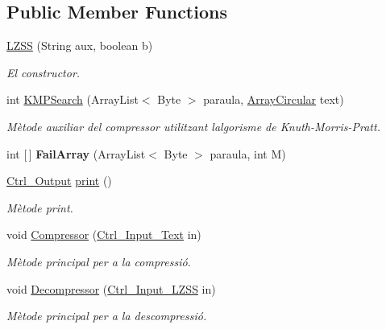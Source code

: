 \subsection*{Public Member Functions}
\begin{DoxyCompactItemize}
\item 
\hyperlink{classdomini_1_1algorithm_1_1LZSS_a991f29ccc89ecbb5645ea8f123205e20}{L\+Z\+SS} (String aux, boolean b)
\begin{DoxyCompactList}\small\item\em El constructor. \end{DoxyCompactList}\item 
int \hyperlink{classdomini_1_1algorithm_1_1LZSS_a88e88f2bb6e984cadf48e1c71f0234fc}{K\+M\+P\+Search} (Array\+List$<$ Byte $>$ paraula, \hyperlink{classdomini_1_1utils_1_1ArrayCircular}{Array\+Circular} text)
\begin{DoxyCompactList}\small\item\em Mètode auxiliar del compressor utilitzant l\textquotesingle{}algorisme de Knuth-\/\+Morris-\/\+Pratt. \end{DoxyCompactList}\item 
\mbox{\label{classdomini_1_1algorithm_1_1LZSS_a56733a42f84d7a58cc5db9ea5f67835f}} 
int \mbox{[}$\,$\mbox{]} {\bfseries Fail\+Array} (Array\+List$<$ Byte $>$ paraula, int M)
\item 
\hyperlink{classpersistencia_1_1output_1_1Ctrl__Output}{Ctrl\+\_\+\+Output} \hyperlink{classdomini_1_1algorithm_1_1LZSS_a8172ff7c8aefb87c90c648bc1b6b78b9}{print} ()
\begin{DoxyCompactList}\small\item\em Mètode print. \end{DoxyCompactList}\item 
void \hyperlink{classdomini_1_1algorithm_1_1LZSS_a385d06ea406b7a0f1168370e9574531a}{Compressor} (\hyperlink{classpersistencia_1_1input_1_1Ctrl__Input__Text}{Ctrl\+\_\+\+Input\+\_\+\+Text} in)
\begin{DoxyCompactList}\small\item\em Mètode principal per a la compressió. \end{DoxyCompactList}\item 
void \hyperlink{classdomini_1_1algorithm_1_1LZSS_a3fcf941d4301a4a857c585b3770a0ecf}{Decompressor} (\hyperlink{classpersistencia_1_1input_1_1Ctrl__Input__LZSS}{Ctrl\+\_\+\+Input\+\_\+\+L\+Z\+SS} in)
\begin{DoxyCompactList}\small\item\em Mètode principal per a la descompressió. \end{DoxyCompactList}\end{DoxyCompactItemize}
